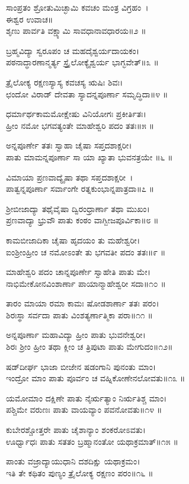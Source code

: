 ಸಾಂಪ್ರತಂ ಶ್ರೋತುಮಿಚ್ಛಾಮಿ ಕವಚಂ ಮಂತ್ರ ವಿಗ್ರಹಂ~।\\
ಈಶ್ವರ ಉವಾಚ॥\\
ಶೃಣು ಪಾರ್ವತಿ ವಕ್ಷ್ಯಾಮಿ ಸಾವಧಾನಾವಧಾರಯ॥೨ ॥

ಬ್ರಹ್ಮವಿದ್ಯಾ ಸ್ವರೂಪಂ ಚ ಮಹದೈಶ್ವರ್ಯದಾಯಕಂ।\\
ಪಠನಾದ್ಧಾರಣಾನ್ಮರ್ತ್ಯ ಸ್ತ್ರೈಲೋಕ್ಯೈಶ್ವರ್ಯ ಭಾಗ್ಭವೇತ್॥೩ ॥

ತ್ರೈಲೋಕ್ಯ ರಕ್ಷಣಸ್ಯಾಸ್ಯ ಕವಚಸ್ಯ ಋಷಿಃ ಶಿವಃ।\\
ಛಂದೋ ವಿರಾಡ್ ದೇವತಾ ಸ್ಯಾದನ್ನಪೂರ್ಣಾ ಸಮೃದ್ಧಿದಾ॥೪ ॥

ಧರ್ಮಾರ್ಥಕಾಮಮೋಕ್ಷೇಷು ವಿನಿಯೋಗಃ ಪ್ರಕೀರ್ತಿತಃ।\\
ಹ್ರೀಂ ನಮೋ ಭಗವತ್ಯಂತೇ ಮಾಹೇಶ್ವರಿ ಪದಂ ತತಃ॥೫ ॥

ಅನ್ನಪೂರ್ಣೇ ತತಃ ಸ್ವಾಹಾ ಚೈಷಾ ಸಪ್ತದಶಾಕ್ಷರೀ।\\
ಪಾತು ಮಾಮನ್ನಪೂರ್ಣಾ ಸಾ ಯಾ ಖ್ಯಾತಾ ಭುವನತ್ರಯೇ ॥೬ ॥

ವಿಮಾಯಾ ಪ್ರಣವಾದ್ಯೈಷಾ ತಥಾ ಸಪ್ತದಶಾಕ್ಷರೀ~।\\
ಪಾತ್ವನ್ನಪೂರ್ಣಾ ಸರ್ವಾಂಗೇ ರತ್ನಕುಂಭಾನ್ನಪಾತ್ರದಾ॥೭ ॥

ಶ್ರೀಬೀಜಾದ್ಯಾ ತಥೈವೈಷಾ ದ್ವಿರಂಧ್ರಾರ್ಣಾ ತಥಾ ಮುಖಂ।\\
ಪ್ರಣವಾದ್ಯಾ ಭ್ರುವೌ ಪಾತು ಕಂಠಂ ವಾಗ್ಬೀಜಪೂರ್ವಿಕಾ॥೮ ॥

ಕಾಮಬೀಜಾದಿಕಾ ಚೈಷಾ ಹೃದಯಂ ತು ಮಹೇಶ್ವರೀ।\\
ಐಂಶ್ರೀಂಹ್ರೀಂ ಚ ನಮೋಽಂತೇ ತು ಭಗವತೀ ಪದಂ ತತಃ॥೯ ॥

ಮಾಹೇಶ್ವರಿ ಪದಂ ಚಾನ್ನಪೂರ್ಣೇ ಸ್ವಾಹೇತಿ ಪಾತು ಮೇ।\\
ನಾಭಿಮೇಕೋನವಿಂಶಾರ್ಣಾ ಪಾಯಾನ್ಮಾಹೇಶ್ವರೀ ಸದಾ॥೧೦ ॥

ತಾರಂ ಮಾಯಾ ರಮಾ ಕಾಮಃ ಷೋಡಶಾರ್ಣಾ ತತಃ ಪರಂ।\\
ಶಿರಃಸ್ಥಾ ಸರ್ವದಾ ಪಾತು ವಿಂಶತ್ಯರ್ಣಾತ್ಮಿಕಾ ಪರಾ॥೧೧ ॥

ಅನ್ನಪೂರ್ಣಾ ಮಹಾವಿದ್ಯಾ ಹ್ರೀಂ ಪಾತು ಭುವನೇಶ್ವರೀ।\\
ಶಿರಃ ಶ್ರೀಂ ಹ್ರೀಂ ತಥಾ ಕ್ಲೀಂ ಚ ತ್ರಿಪುಟಾ ಪಾತು ಮೇಗುದಂ॥೧೨॥

ಷಡ್‌ದೀರ್ಘ ಭಾಜಾ ಬೀಜೇನ ಷಡಂಗಾನಿ ಪುನಂತು ಮಾಂ।\\
ಇಂದ್ರೋ ಮಾಂ ಪಾತು ಪೂರ್ವಂ ಚ ವಹ್ನಿಕೋಣೇನಲೋವತು॥೧೩ ॥

ಯಮೋಮಾಂ ದಕ್ಷಿಣೇ ಪಾತು ನೈರ್ಋತ್ಯಾಂ ನಿರ್ಋತಿಶ್ಚ ಮಾಂ।\\
ಪಶ್ಚಿಮೇ ವರುಣಃ ಪಾತು ವಾಯವ್ಯಾಂ ಪವನೋವತು॥೧೪ ॥

ಕುಬೇರಶ್ಚೋತ್ತರೇ ಪಾತು ಚೈಶಾನ್ಯಾಂ ಶಂಕರೋಽವತು।\\
ಊರ್ಧ್ವಾಧಃ ಪಾತು ಸತತಂ ಬ್ರಹ್ಮಾನಂತೋ ಯಥಾಕ್ರಮಾತ್॥೧೫ ॥

ಪಾಂತು ವಜ್ರಾದ್ಯಾಯುಧಾನಿ ದಶದಿಕ್ಷು ಯಥಾಕ್ರಮಂ।\\
ಇತಿ ತೇ ಕಥಿತಂ ಪುಣ್ಯಂ ತ್ರೈಲೋಕ್ಯ ರಕ್ಷಣಂ ಪರಂ॥೧೬ ॥

